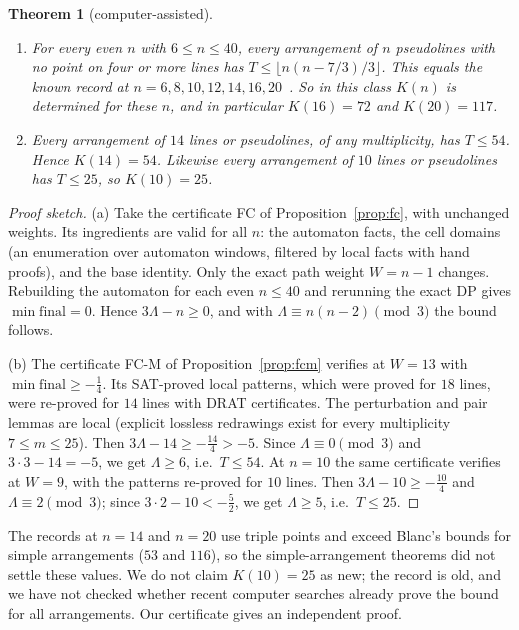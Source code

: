\documentclass[11pt]{article}
\newtheorem{theorem}{Theorem}
\theoremstyle{definition}
\theoremstyle{remark}
\newcommand{\Lam}{\Lambda}
\begin{document}
\begin{theorem}[computer-assisted]\label{thm:othern}
\begin{enumerate}[nosep,label=(\alph*)]
\item For every even $n$ with $6\le n\le 40$, every arrangement of $n$ pseudolines with no point on four or more lines
has $T\le\lfloor n(n-7/3)/3\rfloor$. This equals the known record at $n=6,8,10,12,14,16,20$~\cite{gallery,oeis}. So in
this class $K(n)$ is determined for these $n$, and in particular $K(16)=72$ and $K(20)=117$.
\item Every arrangement of $14$ lines or pseudolines, of any multiplicity, has $T\le 54$. Hence $K(14)=54$.
Likewise every arrangement of $10$ lines or pseudolines has $T\le 25$, so $K(10)=25$.
\end{enumerate}
\end{theorem}
\begin{proof}[Proof sketch]
(a) Take the certificate FC of Proposition~\ref{prop:fc}, with unchanged weights. Its ingredients are valid for all
$n$: the automaton facts, the cell domains (an enumeration over automaton windows, filtered by local facts with hand
proofs), and the base identity. Only the exact path weight $W=n-1$ changes. Rebuilding the automaton for each even
$n\le 40$ and rerunning the exact DP gives $\min\mathrm{final}=0$. Hence $3\Lam-n\ge 0$, and with
$\Lam\equiv n(n-2)\pmod 3$ the bound follows.

(b) The certificate FC-M of Proposition~\ref{prop:fcm} verifies at $W=13$ with $\min\mathrm{final}\ge-\tfrac14$. Its
SAT-proved local patterns, which were proved for $18$ lines, were re-proved for $14$ lines with DRAT certificates. The
perturbation and pair lemmas are local (explicit lossless redrawings exist for every multiplicity $7\le m\le 25$).
Then $3\Lam-14\ge-\tfrac{14}{4}>-5$. Since $\Lam\equiv 0\pmod 3$ and $3\cdot 3-14=-5$, we get $\Lam\ge 6$, i.e.\
$T\le 54$. At $n=10$ the same certificate verifies at $W=9$, with the patterns re-proved for $10$ lines. Then
$3\Lam-10\ge-\tfrac{10}{4}$ and $\Lam\equiv 2\pmod 3$; since $3\cdot 2-10<-\tfrac52$, we get $\Lam\ge 5$, i.e.\
$T\le 25$.
\end{proof}
\noindent The records at $n=14$ and $n=20$ use triple points and exceed Blanc's bounds for simple arrangements ($53$
and $116$), so the simple-arrangement theorems did not settle these values. We do not claim $K(10)=25$ as new; the
record is old, and we have not checked whether recent computer searches already prove the bound for all
arrangements. Our certificate gives an independent proof.
\end{document}
